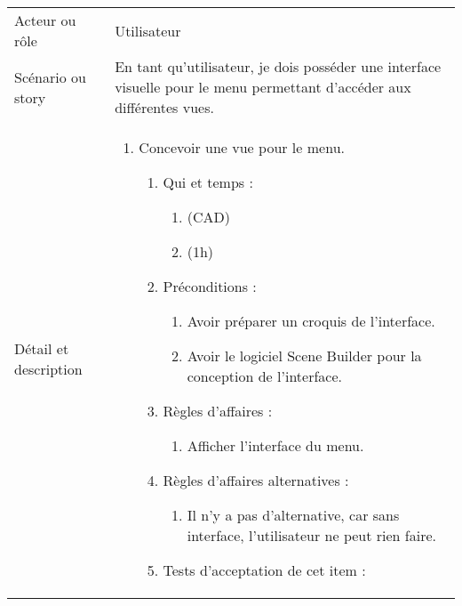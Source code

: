 \begin{longtable}{|l|p{}|}
\hline
    \rowcolor{Gray}
    \multicolumn{2}{|l|}{3} \\
\hline
    Acteur ou rôle & Utilisateur \\
\hline
    Scénario ou story & En tant qu’utilisateur, je
    dois posséder une interface
    visuelle pour le menu permettant d'accéder aux différentes vues. \\
\hline
    Détail et description &
        \begin{enumerate}[label*=\arabic*.]
            \item Concevoir une vue pour le menu.
                \begin{enumerate}[label*=\arabic*.]
                                \item Qui et temps :
                                \begin{enumerate}[label*=\arabic*.]
                                    \item (CAD)
                                    \item (1h)
                                \end{enumerate}
                                \item Préconditions :
                                \begin{enumerate}[label*=\arabic*.]
                                    \item Avoir préparer un croquis de l'interface.
                                    \item Avoir le logiciel Scene Builder pour la conception de l'interface.
                                \end{enumerate}
                                \item Règles d'affaires :
                                \begin{enumerate}[label*=\arabic*.]
                                    \item Afficher l'interface du menu.
                                \end{enumerate}
                                \item Règles d'affaires alternatives :
                                \begin{enumerate}[label*=\arabic*.]
                                    \item Il n'y a pas d'alternative, car sans interface, l'utilisateur ne peut rien faire.
                                \end{enumerate}
                                \item Tests d'acceptation de cet item :

\end{enumerate}
\end{enumerate}
\end{longtable}
